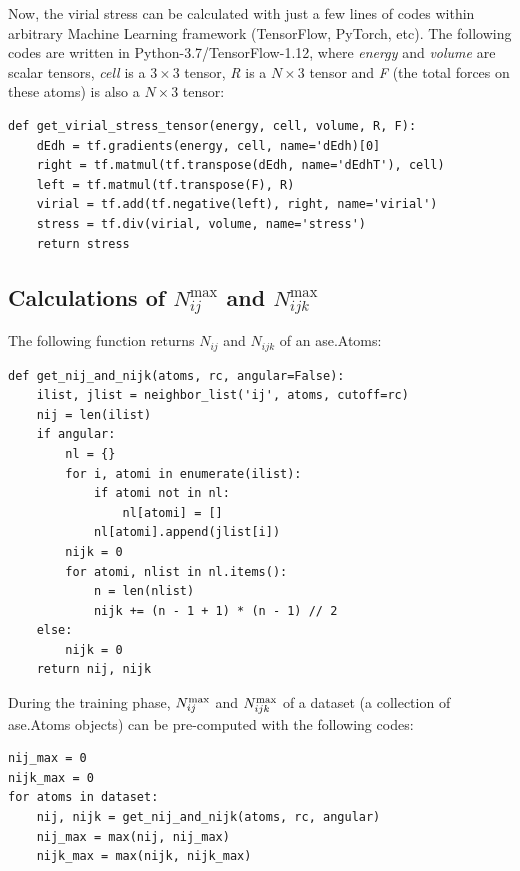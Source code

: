 \documentclass[preprint]{revtex4-2}
\begin{document}
Now, the virial stress can be calculated with just a few lines of codes within 
arbitrary Machine Learning framework (TensorFlow, PyTorch, etc). The following 
codes are written in Python-3.7/TensorFlow-1.12, where \textit{energy} and 
\textit{volume} are scalar tensors, \textit{cell} is a $3 \times 3$ tensor, 
\textit{R} is a $N\times 3$ tensor and \textit{F} (the total forces 
on these atoms) is also a $N\times 3$ tensor:
\begin{verbatim}
def get_virial_stress_tensor(energy, cell, volume, R, F):
    dEdh = tf.gradients(energy, cell, name='dEdh)[0]
    right = tf.matmul(tf.transpose(dEdh, name='dEdhT'), cell)
    left = tf.matmul(tf.transpose(F), R)
    virial = tf.add(tf.negative(left), right, name='virial')
    stress = tf.div(virial, volume, name='stress')
    return stress
\end{verbatim}

\newpage

% 
%
\subsection{
    Calculations of \texorpdfstring{$N_{ij}^{\mathrm{max}}$}{Nijmax} and 
    \texorpdfstring{$N_{ijk}^{\mathrm{max}}$}{Nijkmax}
}

The following function returns $N_{ij}$ and $N_{ijk}$ of an \textmd{ase.Atoms}:
\begin{verbatim}
def get_nij_and_nijk(atoms, rc, angular=False):
    ilist, jlist = neighbor_list('ij', atoms, cutoff=rc)
    nij = len(ilist)
    if angular:
        nl = {}
        for i, atomi in enumerate(ilist):
            if atomi not in nl:
                nl[atomi] = []
            nl[atomi].append(jlist[i])
        nijk = 0
        for atomi, nlist in nl.items():
            n = len(nlist)
            nijk += (n - 1 + 1) * (n - 1) // 2
    else:
        nijk = 0
    return nij, nijk
\end{verbatim}
During the training phase, $N_{ij}^{\mathrm{max}}$ and $N_{ijk}^{\mathrm{max}}$ of a dataset (a collection 
of \textmd{ase.Atoms} objects) can be pre-computed with the following codes:
\begin{verbatim}
nij_max = 0
nijk_max = 0
for atoms in dataset:
    nij, nijk = get_nij_and_nijk(atoms, rc, angular)
    nij_max = max(nij, nij_max)
    nijk_max = max(nijk, nijk_max)
\end{verbatim}
\end{document}

